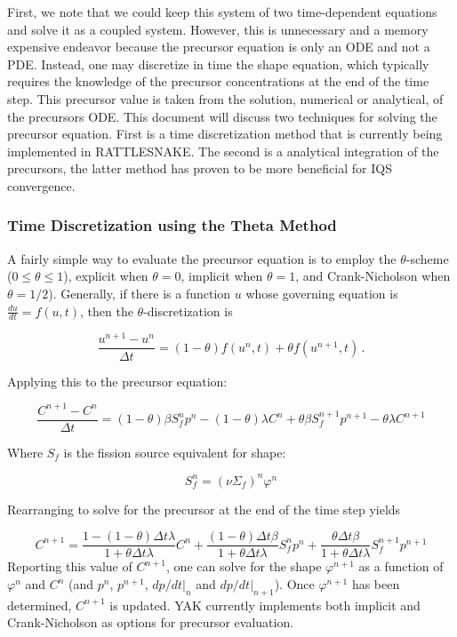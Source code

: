 \documentclass[12pt]{article}
\newcommand{\be}{\begin{equation}}
\newcommand{\ee}{\end{equation}}
\begin{document}
First, we note that we could keep this system of two time-dependent equations and solve it as a coupled system. 
However, this is unnecessary and a memory expensive endeavor because the precursor equation is only an ODE and not a PDE. 
Instead, one may discretize in time the shape equation, which typically requires the knowledge of the
precursor concentrations at the end of the time step. This precursor value is taken from the solution, numerical or analytical,
of the precursors ODE. This document will discuss two techniques for solving the precursor equation.  First is a time discretization method that is currently being implemented in RATTLESNAKE.  The second is a analytical integration of the precursors, the latter method has proven to be more beneficial for IQS convergence.


\subsubsection{Time Discretization using the Theta Method}

A fairly simple way to evaluate the precursor equation is to employ the $\theta$-scheme ($0\le\theta\le1$),
explicit when $\theta=0$, implicit when $\theta=1$, and Crank-Nicholson when $\theta=1/2$).
Generally, if there is a function $u$ whose governing equation is $\frac{du}{dt}=f(u,t)$,
then the $\theta$-discretization is

\be
\frac{u^{n+1}-u^n}{\Delta t}=(1-\theta)f(u^n,t) + \theta f(u^{n+1},t) \,.
\ee

Applying this to the precursor equation:

\be
\frac{C^{n+1}-C^n}{\Delta t}=(1-\theta)\beta S_f^np^n-(1-\theta)\lambda C^n + \theta\beta S_f^{n+1}p^{n+1}-\theta\lambda C^{n+1}
\ee

Where $S_f$ is the fission source equivalent for shape:

\be
S_f^n=(\nu\Sigma_f)^n\varphi^n
\ee

Rearranging to solve for the precursor at the end of the time step yields

\be
C^{n+1} = \frac{1-(1-\theta)\Delta t\lambda}{1+\theta\Delta t\lambda}C^n + \frac{(1-\theta)\Delta t \beta}{1+\theta\Delta t\lambda}S_f^n p^n +  \frac{\theta\Delta t \beta}{1+\theta\Delta t\lambda}S_f^{n+1} p^{n+1}
\ee
Reporting this value of $C^{n+1}$, one can solve for the shape $\varphi^{n+1}$ as a function of $\varphi^n$ and $C^n$
(and $p^n$, $p^{n+1}$, $dp/dt|_n$ and  $dp/dt|_{n+1}$).
Once $\varphi^{n+1}$ has been determined, $C^{n+1}$ is updated. YAK currently implements both implicit and Crank-Nicholson as options for precursor evaluation.
\end{document}
